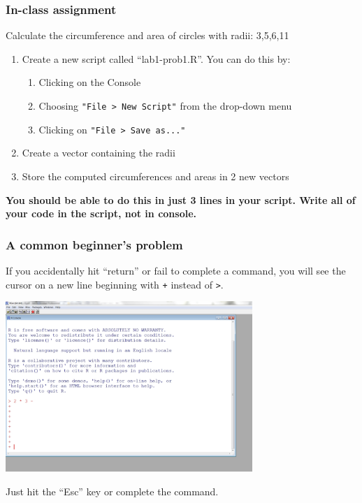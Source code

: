\documentclass[color=usenames,dvipsnames]{beamer}\usepackage[]{graphicx}\usepackage[]{color}
\begin{document}
\begin{frame}[fragile]
  \frametitle{In-class assignment}
  {Calculate the circumference and area of circles with radii: 3,5,6,11} \\
  \pause
  \vspace{0.5cm}
  \begin{enumerate}[\bf (1)]
    \item Create a new script called ``lab1-prob1.R''. You can do this by:
      \begin{enumerate}[i]
        \item Clicking on the Console
        \item Choosing \verb_"File > New Script"_ from the drop-down menu
        \item Clicking on \verb_"File > Save as..."_
      \end{enumerate}
    \item Create a vector containing the radii
    \item Store the computed circumferences and areas in 2 new vectors
  \end{enumerate}
  \vspace{1cm}
  \centering
  {\bf You should be able to do this in just 3 lines in your
    script. Write all of your code in the script, not in console. \\}
\end{frame}




\begin{frame}[fragile]
  \frametitle{A common beginner's problem}
  If you accidentally hit ``return'' or fail to complete a command, you
  will see the cursor on a new line beginning with \verb_+_ instead of
  \verb+>+. \\
  \pause
  \begin{center}
    \includegraphics[width=0.7\textwidth]{figs/plus-prompt}
  \end{center}
  \pause
  Just hit the ``Esc'' key or complete the command.
\end{frame}
\end{document}

